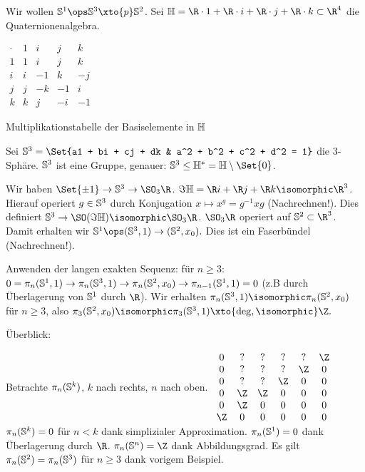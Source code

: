 \begin{ex}
    Wir wollen $\S^1 \ops \S^3 \xto{p} \S^2$.
    Sei $\H = \R \cdot 1 + \R \cdot i + \R \cdot j + \R \cdot k \subset \R^4$ die Quaternionenalgebra.
    \begin{table}[ht]
        \centering
        $\begin{array}{c|cccc}
            \cdot & 1 & i & j & k \\ \hline
            1 & 1 & i & j & k \\
            i & i & -1 & k & -j \\
            j & j & -k & -1 & i \\
            k & k & j & -i & -1
        \end{array}$
        \caption{Multiplikationstabelle der Basiselemente in $\H$}
    \end{table}
    Sei $\S^3 = \Set{a1 + bi + cj + dk & a^2 + b^2 + c^2 + d^2 = 1}$ die 3-Sphäre.
    $\S^3$ ist eine Gruppe, genauer: $\S^3 \le \H^* = \H \setminus \Set{0}$.

    Wir haben $\Set{\pm 1} \to \S^3 \to \SO_3\R$.
    $\Im \H = \R i + \R j + \R k \isomorphic \R^3$.
    Hierauf operiert $g \in \S^3$ durch Konjugation $x \mapsto x^g = g^{-1} x g$ (Nachrechnen!).
    Dies definiert $\S^3 \to \SO(\Im \H) \isomorphic \SO_3 \R$.
    $\SO_3 \R$ operiert auf $\S^2 \subset \R^3$.
    Damit erhalten wir
    \begin{math}
        \S^1 \ops (\S^3, 1) \to (\S^2, x_0).
    \end{math}
    Dies ist ein Faserbündel (Nachrechnen!).

    Anwenden der langen exakten Sequenz: für $n \ge 3$:
    \begin{math}
        0 = \pi_n(\S^1,1) \to \pi_n(\S^3,1) \to \pi_n(\S^2,x_0) \to \pi_{n-1}(\S^1, 1) = 0
    \end{math}
    (z.B durch Überlagerung von $\S^1$ durch $\R$).
    Wir erhalten $\pi_n(\S^3,1) \isomorphic \pi_n(\S^2,x_0)$ für $n \ge 3$, also
    \begin{math}
        \pi_3(\S^2, x_0) \isomorphic \pi_3(\S^3,1) \xto{\mathrm{deg},\isomorphic} \Z.
    \end{math}
\end{ex}

Überblick:

Betrachte $\pi_n(\S^k)$, $k$ nach rechts, $n$ nach oben.
\begin{math}
    \begin{array}{cccccc}
        0 & ? & ? & ? & ? & \Z \\
        0 & ? & ? & ? & \Z & 0 \\
        0 & ? & ? & \Z & 0 & 0 \\
        0 & \Z & \Z & 0 & 0 & 0 \\
        0 & \Z & 0 & 0 & 0 & 0 \\
        \Z & 0 & 0 & 0 & 0 & 0
    \end{array}
\end{math}
$\pi_n(\S^k) = 0$ für $n < k$ dank simplizialer Approximation.
$\pi_n(\S^1) = 0$ dank Überlagerung durch $\R$.
$\pi_n(\S^n) = \Z$ dank Abbildungsgrad.
Es gilt $\pi_n(\S^2) = \pi_n(\S^3)$ für $n \ge 3$ dank vorigem Beispiel.


